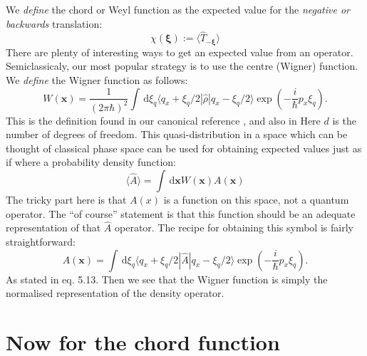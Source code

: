 \documentclass[a4paper,12pt]{article}
\newcommand{\ihb}{\frac{i}{\hbar}}
\newcommand{\xfase}{\mathbf{x}}
\newcommand{\xifase}{ {\boldsymbol{\xi}} }
\newcommand{\bra}[1]{\langle #1|}
\newcommand{\ket}[1]{|#1\rangle}
\newcommand{\rd}{\, \mathrm{d}}
\begin{document}
We \emph{define} the chord or Weyl function as the expected
value for the \emph{negative or backwards} translation:
\begin{equation}\label{chidef}
\chi(\xifase):=\langle \hat{T}_{-\xifase} \rangle
\end{equation}
There are plenty of interesting ways to get an expected
value from an operator. Semiclassicaly, our most popular
strategy is to use the centre (Wigner) function. We \emph{define}
the Wigner function as follows:
\begin{equation}\label{wigdef}
W(\xfase)=\frac{1}{(2\pi\hbar)^2}
\int \rd \xi_q
\bra{q_x+\xi_q/2} \hat{\rho}\ket{q_x-\xi_q/2} \exp(-\ihb p_x \xi_q).
\end{equation} 
This is the definition found in our canonical
reference \cite{Ozorio98},
and also in \cite{Ozorio11} Here $d$ is the number of 
degrees of freedom. This quasi-distribution in a space
which can be thought of classical phase space
can be used for obtaining expected values just as if where a
probability density function:
\begin{equation}
\langle \hat{A} \rangle =
\int \rd \xfase W(\xfase) A(\xfase)
\end{equation}
The tricky part here is that $A(x)$ is a function
on this space, not a quantum operator. The ``of course'' statement
is that this function should be an adequate representation of
that $\hat{A}$ operator. The recipe for obtaining this
symbol is fairly straightforward:
\begin{equation}\label{opcendef}
A(\xfase)=
\int \rd \xi_q
\bra{q_x+\xi_q/2} \hat{A}\ket{q_x-\xi_q/2} \exp(-\ihb p_x \xi_q).
\end{equation} 
As stated in eq. 5.13. Then we see that the Wigner function
is simply the normalised representation of the density operator.

\section{Now for the chord function}
\end{document}
